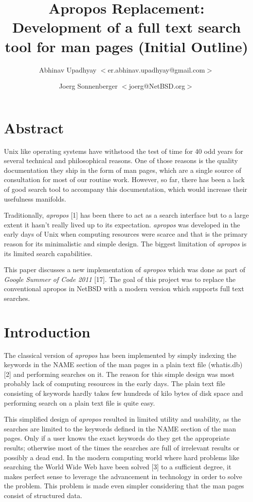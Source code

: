 \documentclass[titlepage, a4paper, 12pt]{article}
\title{Apropos Replacement: Development of a full text search tool for man pages \newline
(Initial Outline)}
\author{Abhinav Upadhyay $<$er.abhinav.upadhyay@gmail.com$>$ \and 
Joerg Sonnenberger $<$joerg@NetBSD.org$>$}
\begin{document}
\maketitle
\section{Abstract}
Unix like operating systems have withstood the test of time for 40 odd years for
several technical and philosophical reasons. One of those reasons is the
quality documentation they ship in the form of man pages, which are a single
source of consultation for most of our routine work. However, so far, there has been a lack of
good search tool to accompany this documentation, which would increase their
usefulness manifolds.

Traditionally, \textit{apropos} [1] has been there to act as a search
interface but to a large extent it hasn't really lived up to its expectation.
\textit{apropos} was
developed in the early days of Unix when computing resources were scarce and
that is the primary reason for its minimalistic and simple design. The biggest
limitation of \textit{apropos} is its limited search capabilities.

This paper discusses a new implementation of \textit{apropos} which was done
as part of \emph{Google Summer of Code 2011} [17]. The goal of this project was
to replace the conventional apropos in NetBSD with a modern version which
supports full text searches.
\section{Introduction}
The classical version of \textit{apropos} has been implemented by simply
indexing the keywords in the NAME section of the man pages in a plain text file
(whatis.db) [2]
and performing searches on it. The reason for this simple design was most
probably lack of computing resources in the early days. The plain text file
consisting of keywords hardly takes few hundreds of kilo bytes of disk space
and performing search on a plain text file is quite easy.

This simplified design of \textit{apropos} resulted in limited utility and
usability, as the searches are limited to the keywords defined in the NAME
section of the man pages. Only if a user knows the exact keywords do they get
the appropriate results; otherwise most of
the times the searches are full of irrelevant results or possibly a dead end. 
In the modern
computing world where hard problems like searching the World Wide Web have been
solved [3] to a sufficient degree, it makes perfect sense to leverage the
advancement in technology in order to solve the problem. This problem is made
even simpler considering that the man pages consist of structured data.
\end{document}
